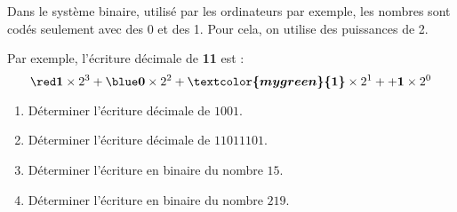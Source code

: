 \begin{exercice*}
    Dans le système binaire, utilisé par les ordinateurs par exemple, les nombres sont codés seulement avec
    des 0 et des 1. Pour cela, on utilise des puissances de 2.

    Par exemple, l’écriture décimale de {\bfseries {}{}\textcolor{mygreen}{1}1} est :
    $$\boldsymbol{{\red 1}} \times 2^3 + \boldsymbol{{\blue 0}} \times 2^2 + \boldsymbol{{\textcolor{mygreen}{1}}} \times 2^1 +  + \boldsymbol{1} \times 2^0$$
    \begin{enumerate}
        \item Déterminer l’écriture décimale de $1001$.
        \item Déterminer l’écriture décimale de $11011101$.
        \item Déterminer l’écriture en binaire du nombre $15$.
        \item Déterminer l’écriture en binaire du nombre $219$.
    \end{enumerate}
\end{exercice*}
